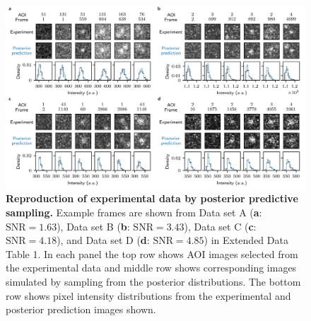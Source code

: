 \begin{figure}[h]
\centering
\includegraphics[width=\textwidth]{figures/figure4.png}
\caption{\textbf{Reproduction of experimental data by posterior predictive sampling.} Example frames are shown from Data set A  (\textbf{a}: $\mathrm{SNR}=1.63$), Data set B (\textbf{b}: $\mathrm{SNR}=3.43$), Data set C (\textbf{c}: $\mathrm{SNR}=4.18$), and Data set D (\textbf{d}: $\mathrm{SNR}=4.85$) in Extended Data Table 1. In each panel the top row shows AOI images selected from the experimental data and middle row shows corresponding images simulated by sampling from the posterior distributions. The bottom row shows pixel intensity distributions from the experimental and posterior prediction images shown. }
\label{fig:posterior_samples}
\end{figure}
\clearpage
\newpage


